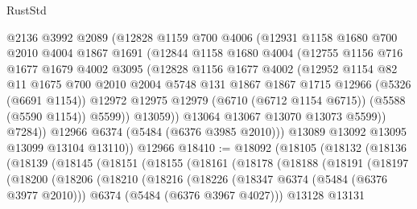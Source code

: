 \begin{lexlean}{RustStd}
\begin{coremodule}
{\begin{coremodule}
{{{{{{{{{{{{{{{{{{{{{{{{{{{{{{{              @2136
              @3992
              @2089
              (@12828
                @1159
                @700
                @4006
                (@12931
                  @1158
                  @1680
                  @700
                  @2010
                  @4004
                  @1867
                  @1691
                  (@12844
                    @1158
                    @1680
                    @4004
                    (@12755
                      @1156
                      @716
                      @1677
                      @1679
                      @4002
                      @3095
                      (@12828
                        @1156
                        @1677
                        @4002
                        (@12952
                          @1154
                          @82
                          @11
                          @1675
                          @700
                          @2010
                          @2004
                          @5748
                          @131
                          @1867
                          @1867
                          @1715
                          @12966
                          (@5326 (@6691 @1154))
                          @12972
                          @12975
                          @12979
                          (@6710 (@6712 @1154 @6715))
                          (@5588 (@5590 @1154))
                          @5599))
                      @13059))
                  @13064
                  @13067
                  @13070
                  @13073
                  @5599))
              @7284))
          @12966
          @6374
          (@5484 (@6376 @3985 @2010)))
        @13089
        @13092
        @13095
        @13099
        @13104
        @13110))
    @12966
@18410 := @18092
    (@18105
      (@18132
        (@18136
          (@18139
            (@18145
              (@18151
                (@18155
                  (@18161
                    (@18178
                      (@18188
                        (@18191
                          (@18197
                            (@18200
                              (@18206
                                (@18210
                                  (@18216
                                    (@18226
                                      (@18347 @6374 (@5484 (@6376 @3977 @2010)))
                                      @6374
                                      (@5484 (@6376 @3967 @4027)))
                                    @13128
                                    @13131
}}}}}}}}}}}}}}}}}}}}}}}}}}}}}}}
\end{coremodule}}
\end{coremodule}
\end{lexlean}
